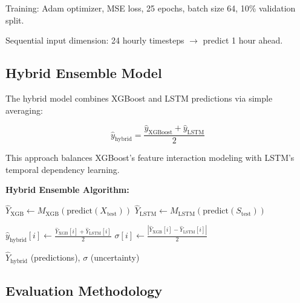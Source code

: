 \documentclass[11pt, a4paper, oneside]{article}
\begin{document}
Training: Adam optimizer, MSE loss, 25 epochs, batch size 64, 10\% validation split.

Sequential input dimension: 24 hourly timesteps $\rightarrow$ predict 1 hour ahead.

\subsection{Hybrid Ensemble Model}

The hybrid model combines XGBoost and LSTM predictions via simple averaging:

\begin{equation}
\hat{y}_{\text{hybrid}} = \frac{\hat{y}_{\text{XGBoost}} + \hat{y}_{\text{LSTM}}}{2}
\end{equation}

This approach balances XGBoost's feature interaction modeling with LSTM's temporal dependency learning.

\textbf{Hybrid Ensemble Algorithm:}

\begin{algorithm}[H]
\caption{Hybrid Ensemble Prediction}
\label{alg:hybrid_ensemble}
\begin{algorithmic}[1]

\State $\hat{Y}_{\text{XGB}} \gets M_{\text{XGB}}(\text{predict}(X_{\text{test}}))$ 
\State $\hat{Y}_{\text{LSTM}} \gets M_{\text{LSTM}}(\text{predict}(S_{\text{test}}))$ 

    \State $\hat{y}_{\text{hybrid}}[i] \gets \frac{\hat{Y}_{\text{XGB}}[i] + \hat{Y}_{\text{LSTM}}[i]}{2}$ 
    \State $\sigma[i] \gets \frac{|\hat{Y}_{\text{XGB}}[i] - \hat{Y}_{\text{LSTM}}[i]|}{2}$ 
\EndFor

\State \Return $\hat{Y}_{\text{hybrid}}$ (predictions), $\sigma$ (uncertainty)
\end{algorithmic}
\end{algorithm}

\subsection{Evaluation Methodology}
\end{document}
